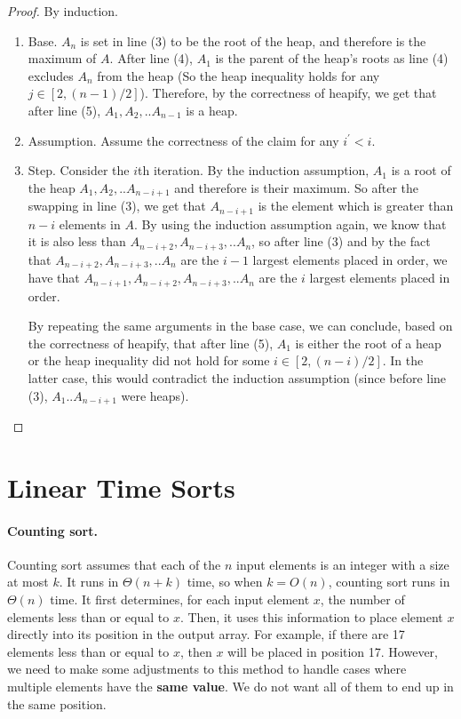\begin{proof}
By induction.
\begin{enumerate}
  \item Base. $A_{n}$ is set in line (3) to be the root of the heap, and therefore is the maximum of $A$. After line (4), $A_{1}$ is the parent of the heap's roots as line (4) excludes $A_{n}$ from the heap (So the heap inequality holds for any $j\in [2,(n-1)/2]$). Therefore, by the correctness of heapify, we get that after line (5), $A_{1},A_{2},..A_{n-1}$ is a heap.
  \item Assumption. Assume the correctness of the claim for any $i^{\prime}<i$.
  \item Step. Consider the $i$th iteration. By the induction assumption, $A_{1}$ is a root of the heap $A_{1},A_{2},..A_{n-i+1}$ and therefore is their maximum. So after the swapping in line (3), we get that $A_{n-i+1}$ is the element which is greater than $n-i$ elements in $A$. By using the induction assumption again, we know that it is also less than $A_{n-i+2},A_{n-i+3},..A_{n}$, so after line (3) and by the fact that $A_{n-i+2},A_{n-i+3},..A_{n}$ are the $i-1$ largest elements placed in order, we have that $A_{n-i+1},A_{n-i+2},A_{n-i+3},..A_{n}$ are the $i$ largest elements placed in order. 

    By repeating the same arguments in the base case, we can conclude, based on the correctness of heapify, that after line (5), $A_{1}$ is either the root of a heap or the heap inequality did not hold for some $i\in [2,(n-i)/2]$. In the latter case, this would contradict the induction assumption (since before line (3), $A_{1}..A_{n-i+1}$ were heaps).
\end{enumerate}
\end{proof}

\section{Linear Time Sorts}
\paragraph{ Counting sort.}
Counting sort assumes that each of the $n$ input elements is an integer with a size at most $k$. It runs in $\Theta(n + k)$ time, so when $k = O(n)$, counting sort runs in $\Theta(n)$ time. It first determines, for each input element $x$, the number of elements less than or equal to $x$. Then, it uses this information to place element $x$ directly into its position in the output array. For example, if there are 17 elements less than or equal to $x$, then $x$ will be placed in position 17. However, we need to make some adjustments to this method to handle cases where multiple elements have the \textbf{same value}. We do not want all of them to end up in the same position.

